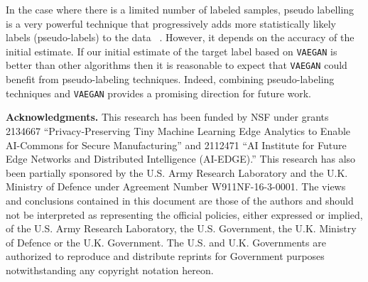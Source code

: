 \documentclass{article}
\newcommand\todo[1]{\textcolor{red}{#1}}
\begin{document}
In the case where there is a limited number of labeled samples, pseudo labelling is a very powerful technique that progressively adds more statistically likely labels (pseudo-labels) to the data ~\cite{chen2020adversarial,zou2018unsupervised}. However, it depends on the accuracy of the initial estimate.  If our initial estimate of the target label based on \verb"VAEGAN" is better than other algorithms then it is reasonable to expect that \verb"VAEGAN" could benefit from pseudo-labeling techniques. Indeed,   combining pseudo-labeling techniques and \verb"VAEGAN" provides a promising direction for future work. %


\noindent
{\bf Acknowledgments.} This research has been funded by NSF under grants 2134667 ``Privacy-Preserving Tiny Machine Learning Edge Analytics to Enable AI-Commons for Secure Manufacturing'' and 2112471 ``AI Institute for Future Edge Networks and Distributed Intelligence (AI-EDGE).'' This research has also been partially sponsored by the U.S. Army Research Laboratory and the U.K. Ministry of Defence under Agreement Number W911NF-16-3-0001. The views and conclusions contained in this document are those of the authors and should not be interpreted as representing the official policies, either expressed or implied, of the U.S. Army Research Laboratory, the U.S. Government, the U.K. Ministry of Defence or the U.K. Government. The U.S. and U.K. Governments are authorized to reproduce and distribute reprints for Government purposes notwithstanding any copyright notation hereon.





\end{document}
